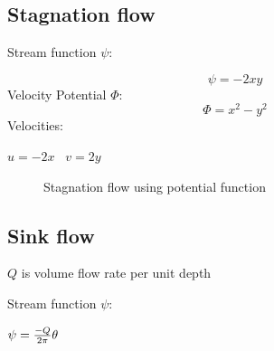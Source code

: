 \subsection{Stagnation flow}

Stream function $\psi$:

$$\psi = -2xy$$
Velocity Potential $\Phi$:
$$\Phi = x^2 - y^2$$
Velocities:

$ u = -2x$ \, $v = 2y$

\begin{figure}[h]
\begin{center}
\end{center}
\caption{Stagnation flow using potential function}
\label{planarstagnationflow}
\end{figure}



\subsection{Sink flow}

$Q$ is  volume flow rate per unit depth

Stream function $\psi$:

$\psi = {-Q \over 2\pi} \theta$

